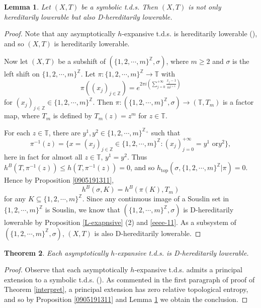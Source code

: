 \documentclass[12pt]{amsart}
\newtheorem{thm}{Theorem}[section]
\newtheorem{lem}[thm]{Lemma}
\theoremstyle{definition} \theoremstyle{question}
\numberwithin{equation}{section}
\begin{document}
\begin{lem} \label{l1}
Let $(X, T)$ be a symbolic t.d.s. Then $(X, T)$ is not only
hereditarily lowerable but also D-hereditarily lowerable.
\end{lem}
\begin{proof}
Note that any asymptotically
$h$-expansive t.d.s. is hereditarily lowerable (\cite[Theorem 7.7]{HYZ1}), and so  $(X, T)$ is
hereditarily lowerable.

Now let $(X,T)$ be a subshift of
$(\{1,2,\cdots,m\}^{\mathbb{Z}},\sigma)$, where $m\ge 2$ and
$\sigma$ is the left shift on $\{1,2,\cdots,m\}^{\mathbb{Z}}$. Let
$\pi: \{1,2,\cdots,m\}^{\mathbb{Z}}\rightarrow \mathbb{T}$ with
$$\pi((x_j)_{j\in \mathbb{Z}})=e^{2\pi i (\sum_{j=0}^{+\infty}
\frac{x_j-1}{m^{j+1}})}$$ for $(x_j)_{j\in \mathbb{Z}}\in
\{1,2,\cdots,m\}^{\mathbb{Z}}$. Then
$\pi:(\{1,2,\cdots,m\}^{\mathbb{Z}},\sigma)\rightarrow
(\mathbb{T},T_m)$ is a factor map, where $T_m$ is defined by
$T_m(z)=z^m$ for $z\in \mathbb{T}$.

For each $z\in \mathbb{T}$, there are $y^1,y^2\in
\{1,2,\cdots,m\}^{\mathbb{Z}_+}$  such that
$$\pi^{-1}(z)=\{x=(x_j)_{j\in \mathbb{Z}}\in
\{1,2,\cdots,m\}^{\mathbb{Z}}: (x_j)_{j=0}^{+\infty}=y^1 \text{ or
}y^2\},$$ here in fact for almost all $z\in \mathbb{T}$, $y^1=y^2$.
Thus $h^B(T,\pi^{-1}(z))\le h(T,\pi^{-1}(z))=0$, and so
$h_{\text{top}}(\sigma,\{1,2,\cdots,m\}^{\mathbb{Z}}|\pi)=0$. Hence
by Proposition \ref{0905191311},
\begin{equation}\label{eeee-11}
h^B(\sigma,K)=h^B(\pi(K),T_m)
\end{equation}
for any $K\subseteq \{1,2,\cdots,m\}^{\mathbb{Z}}$. Since any
continuous image of a Souslin set in $\{1,2,\cdots,m\}^{\mathbb{Z}}$
is Souslin, we know that $(\{1,2,\cdots,m\}^{\mathbb{Z}},\sigma)$ is
D-hereditarily lowerable by Proposition \ref{L-exapnsive} (2) and
\eqref{eeee-11}. As a subsystem of
$(\{1,2,\cdots,m\}^{\mathbb{Z}},\sigma)$, $(X,T)$ is also
D-hereditarily lowerable.
\end{proof}

\begin{thm} \label{again}
Each asymptotically
$h$-expansive t.d.s. is D-hereditarily lowerable.
\end{thm}
\begin{proof}
Observe that each asymptotically $h$-expansive t.d.s. admits a
principal extension to a symbolic t.d.s. (\cite[Theorem 8.6]{BD}).
As commented in the first paragraph of proof of Theorem
\ref{interpret}, a principal extension has zero relative topological
entropy, and so by Proposition \ref{0905191311} and Lemma \ref{l1}
we obtain the conclusion.
\end{proof}
\end{document}
